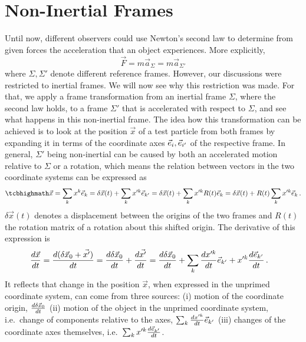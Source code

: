 \documentclass[../class_mech_main.tex]{subfiles}
\begin{document}
    \section{Non-Inertial Frames}\label{sec:non_inertial_frames}
% 
% 



Until now, different observers could use Newton's second law to determine from given forces the acceleration that an object experiences. More explicitly,
\begin{equation}\label{eq:second_law_invariance}
	\vec{F} = m \vec{a}_\Sigma = m \vec{a}_{\Sigma'}
\end{equation}
where $\Sigma, \Sigma'$ denote different reference frames. However, our discussions were restricted to inertial frames. We will now see why this restriction was made. For that, we apply a frame transformation from an inertial frame $\Sigma$, where the second law holds, to a frame $\Sigma'$ that is accelerated with respect to $\Sigma$, and see what happens in this non-inertial frame. The idea how this transformation can be achieved is to look at the position $\vec{x}$ of a test particle from both frames by expanding it in terms of the coordinate axes $\vec{e}_{i}, \vec{e}_{i'}$ of the respective frame. In general, $\Sigma'$ being non-inertial can be caused by both an accelerated motion relative to $\Sigma$ or a rotation, which means the relation between vectors in the two coordinate systems can be expressed as
\begin{equation}\label{eq:vector_different_frames}
	\eqbox{
		\vec{x}
		= \sum_k x^k \unitvec{k}
		= \delta \vec{x}(t) + \sum_k x'^k \unitvec{k'}
		= \delta \vec{x}(t) + \sum_k x'^k R(t) \unitvec{k}
		= \delta \vec{x}(t) + R(t) \sum_k x'^k \unitvec{k}
	} \, .
\end{equation}
$\delta \vec{x}(t)$ denotes a displacement between the origins of the two frames and $R(t)$ the rotation matrix of a rotation about this shifted origin. The derivative of this expression is
\begin{align}\label{eq:vel_non_inert_frame_v1}
	\dv{\vec{x}}{t} &= \dv{(\delta \vec{x}_0 + \vec{x'})}{t}
	= \dv{\delta \vec{x}_0}{t} + \dv{\vec{x'}}{t}
	= \dv{\delta \vec{x}_0}{t} + \sum_k \dv{x'^k}{t} \vec{e}_{k'} + x'^k \dv{\vec{e}_{k'}}{t}
	\, .
\end{align}
It reflects that change in the position $\vec{x}$, when expressed in the unprimed coordinate system, can come from three sources: (i) motion of the coordinate origin, $\dv{\delta \vec{x}_0}{t}$ (ii) motion of the object in the unprimed coordinate system, i.e.~change of components relative to the axes, $\sum_k \dv{x'^k}{t} \vec{e}_{k'}$ (iii) changes of the coordinate axes themselves, i.e.~$\sum_k x'^k \dv{\vec{e}_{k'}}{t}$.
\end{document}

